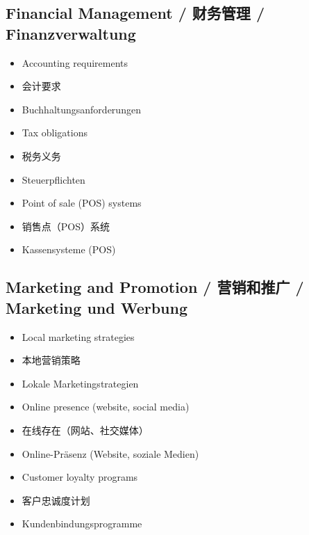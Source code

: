 \subsection{Financial Management / 财务管理 / Finanzverwaltung}
\begin{itemize}
    \item Accounting requirements
    \item 会计要求
    \item Buchhaltungsanforderungen
    \item Tax obligations
    \item 税务义务
    \item Steuerpflichten
    \item Point of sale (POS) systems
    \item 销售点（POS）系统
    \item Kassensysteme (POS)
\end{itemize}

\subsection{Marketing and Promotion / 营销和推广 / Marketing und Werbung}
\begin{itemize}
    \item Local marketing strategies
    \item 本地营销策略
    \item Lokale Marketingstrategien
    \item Online presence (website, social media)
    \item 在线存在（网站、社交媒体）
    \item Online-Präsenz (Website, soziale Medien)
    \item Customer loyalty programs
    \item 客户忠诚度计划
    \item Kundenbindungsprogramme
\end{itemize}
